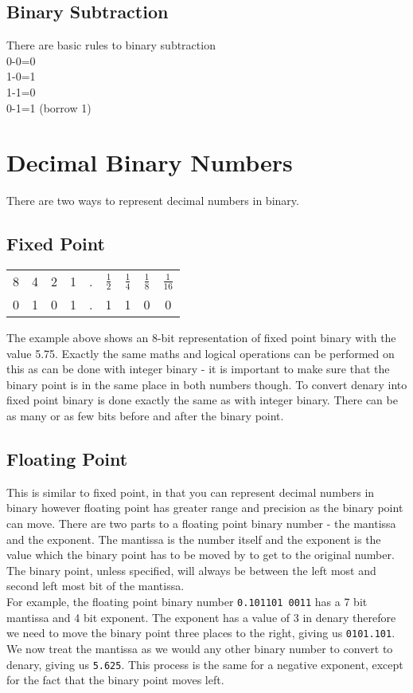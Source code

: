\documentclass[a4paper,11pt, twocolumn]{article}
\begin{document}
\subsection{Binary Subtraction}
There are basic rules to binary subtraction\\
0-0=0\\
1-0=1\\
1-1=0\\
0-1=1 (borrow 1)

\section{Decimal Binary Numbers}
There are two ways to represent decimal numbers in binary. 
\subsection{Fixed Point}
\begin{table}[H]
    \centering
    \begin{tabularx}{0.9\linewidth}{c c c c c c c c c}
        8 & 4 & 2 & 1 & . & $\frac{1}{2}$ & $\frac{1}{4}$ & $\frac{1}{8}$  & $\frac{1}{16}$\\
        0 & 1 & 0 & 1 & . & 1 & 1 & 0 & 0
    \end{tabularx}
\end{table}
The example above shows an 8-bit representation of fixed point binary with the value 5.75. Exactly the same maths and logical operations can be performed on this as can be done with integer binary - it is important to make sure that the binary point is in the same place in both numbers though. To convert denary into fixed point binary is done exactly the same as with integer binary. There can be as many or as few bits before and after the binary point.
\subsection{Floating Point}
This is similar to fixed point, in that you can represent decimal numbers in binary however floating point has greater range and precision as the binary point can move. There are two parts to a floating point binary number - the mantissa and the exponent. The mantissa is the number itself and the exponent is the value which the binary point has to be moved by to get to the original number. The binary point, unless specified, will always be between the left most and second left most bit of the mantissa.\\
For example, the floating point binary number \verb|0.101101 0011| has a 7 bit mantissa and 4 bit exponent. The exponent has a value of 3 in denary therefore we need to move the binary point three places to the right, giving us \verb|0101.101|. We now treat the mantissa as we would any other binary number to convert to denary, giving us \verb|5.625|. This process is the same for a negative exponent, except for the fact that the binary point moves left. 
\end{document}
